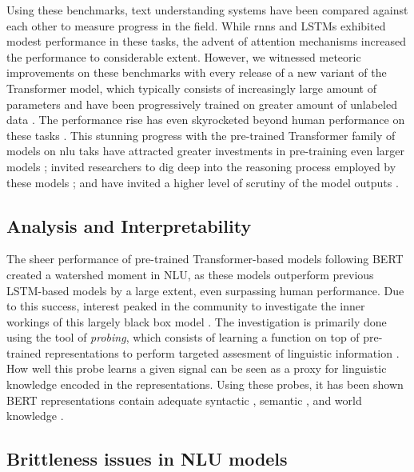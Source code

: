 \documentclass[letterpaper, 12pt]{report}
\begin{document}
Using these benchmarks, text understanding systems have been compared against each other to measure progress in the field. While \acrshort{rnn}s and LSTMs exhibited modest performance in these tasks, the advent of attention mechanisms \citep{bahdanau2014neural} increased the performance to considerable extent. However, we witnessed meteoric improvements on these benchmarks with every release of a new variant of the Transformer model, which typically consists of increasingly large amount of parameters and have been progressively trained on greater amount of unlabeled data \citep{kaplan2020scaling}. The performance rise has even skyrocketed beyond human performance on these tasks \citep[Figure~1]{kiela-etal-2021-dynabench}. This stunning progress with the pre-trained Transformer family of models on \acrshort{nlu} taks have attracted greater investments in pre-training even larger models \citep{Brown2020:GPT3, Zhang2022:OPT}; invited researchers to dig deep into the reasoning process employed by these models \citep{rogers-etal-2020-primer}; and have invited a higher level of scrutiny of the model outputs \citep{jia2017adversarial, gururangan-etal-2018-annotation}.

\subsection{Analysis and Interpretability}

The sheer performance of pre-trained Transformer-based models following BERT created a watershed moment in NLU, as these models outperform previous LSTM-based models by a large extent, even surpassing human performance. Due to this success, interest peaked in the community to investigate the inner workings of this largely black box model \citep{rogers2020}. The investigation is primarily done using the tool of \textit{probing}, which consists of learning a function on top of pre-trained representations to perform targeted assesment of linguistic information \citep{hupkes2018visualisation}. How well this probe learns a given signal can be seen as a proxy for linguistic knowledge encoded in the representations. Using these probes, it has been shown BERT representations contain adequate syntactic \citep{hewitt-manning-2019-structural,jawahar-etal-2019-bert}, semantic \citep{tenney-etal-2019-bert,ettinger2020}, and world knowledge \citep{petroni-etal-2019-language, rogers2020}.

\subsection{Brittleness issues in NLU models}
\end{document}
